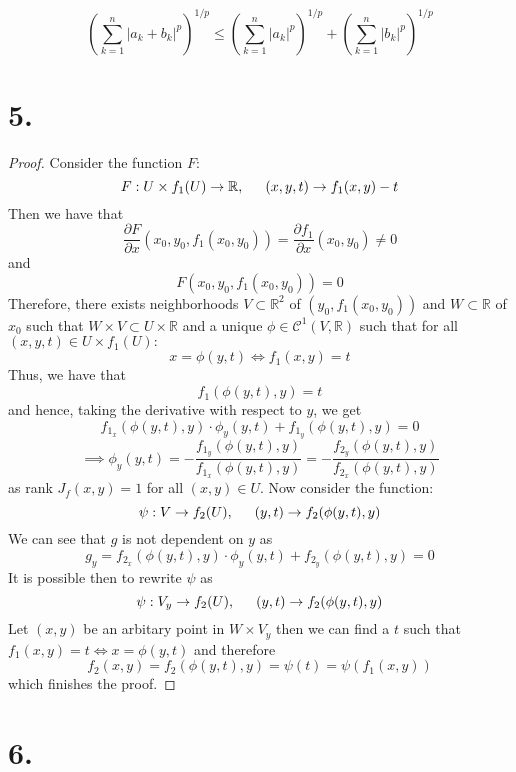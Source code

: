 \documentclass[11pt]{article}
\begin{document}
\[
    \left(\sum_{k=1}^n |a_k+b_k|^p \right)^{1/p} \le \left(\sum_{k=1}^n |a_k|^p \right)^{1/p} 
    + \left(\sum_{k=1}^n |b_k|^p \right)^{1/p}
\]
\pagebreak
\section*{5.}
\begin{proof}
Consider the function $F$:
\[
    F: U \times f_1(U) \to \mathbb{R}, \indent (x,y,t) \to f_1(x,y) - t    
\]
Then we have that
\[
    \frac{\partial F}{\partial x}(x_0,y_0,f_1(x_0,y_0)) = \frac{\partial f_1}{\partial x}(x_0,y_0) \ne 0   
\]
and 
\[
    F(x_0,y_0,f_1(x_0,y_0)) = 0    
\]
Therefore, there exists neighborhoods $V \subset \mathbb{R}^2$ of $(y_0,f_1(x_0,y_0))$ and
$W \subset \mathbb{R}$ of $x_0$ such that $W \times V \subset U \times \mathbb{R}$ and 
a unique $\phi \in \mathcal{C}^1(V, \mathbb{R})$ such that for all $(x,y,t) \in U \times f_1(U):$
\[
    x = \phi(y,t) \iff f_1(x,y) = t 
\]
Thus, we have that
\[
    f_1(\phi(y,t),y) = t
\]
and hence, taking the derivative with respect to $y$, we get
\[
    f_{1_x}(\phi(y,t),y) \cdot \phi_y(y,t) + f_{1_y}(\phi(y,t),y) = 0
\]
\[
    \implies \phi_y(y,t) = -\frac{f_{1_y}(\phi(y,t),y)}{f_{1_x}(\phi(y,t),y)} = -\frac{f_{2_y}(\phi(y,t),y)}{f_{2_x}(\phi(y,t),y)} 
\]
as rank $J_f(x,y) = 1$ for all $(x,y) \in U$.
Now consider the function:
\[
    \psi: V \to f_2(U), \indent (y,t) \to f_2(\phi(y,t),y)
\]
We can see that $g$ is not dependent on $y$ as 
\[
    g_y = f_{2_x}(\phi(y,t),y) \cdot \phi_y(y,t) + f_{2_y}(\phi(y,t),y) = 0
\]
It is possible then to rewrite $\psi$ as 
\[
    \psi: V_y \to f_2(U), \indent (y,t) \to f_2(\phi(y,t),y)    
\]
Let $(x, y)$ be an arbitary point in $W \times V_y$ 
then we can find a $t$ such that $f_1(x,y) = t \iff x = \phi(y,t)$ and therefore
\[
    f_2(x,y) = f_2(\phi(y,t),y) = \psi(t) = \psi(f_1(x,y))    
\]
which finishes the proof.
\end{proof}
\pagebreak
\section*{6.}
\end{document}
